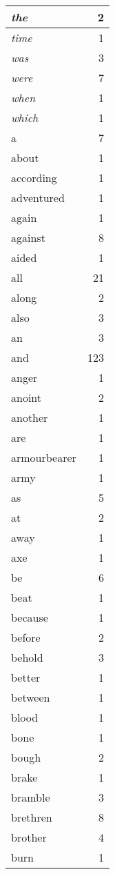 \begin{center}
\begin{longtable}{l|r}
\emph{the} & 2\\ \hline 
\emph{time} & 1\\ \hline 
\emph{was} & 3\\ \hline 
\emph{were} & 7\\ \hline 
\emph{when} & 1\\ \hline 
\emph{which} & 1\\ \hline 
a & 7\\ \hline 
about & 1\\ \hline 
according & 1\\ \hline 
adventured & 1\\ \hline 
again & 1\\ \hline 
against & 8\\ \hline 
aided & 1\\ \hline 
all & 21\\ \hline 
along & 2\\ \hline 
also & 3\\ \hline 
an & 3\\ \hline 
and & 123\\ \hline 
anger & 1\\ \hline 
anoint & 2\\ \hline 
another & 1\\ \hline 
are & 1\\ \hline 
armourbearer & 1\\ \hline 
army & 1\\ \hline 
as & 5\\ \hline 
at & 2\\ \hline 
away & 1\\ \hline 
axe & 1\\ \hline 
be & 6\\ \hline 
beat & 1\\ \hline 
because & 1\\ \hline 
before & 2\\ \hline 
behold & 3\\ \hline 
better & 1\\ \hline 
between & 1\\ \hline 
blood & 1\\ \hline 
bone & 1\\ \hline 
bough & 2\\ \hline 
brake & 1\\ \hline 
bramble & 3\\ \hline 
brethren & 8\\ \hline 
brother & 4\\ \hline 
burn & 1\\ \hline 

\end{longtable}
\end{center}
